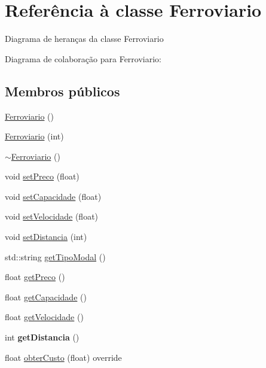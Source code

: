 \hypertarget{classFerroviario}{}\section{Referência à classe Ferroviario}
\label{classFerroviario}


Diagrama de heranças da classe Ferroviario


Diagrama de colaboração para Ferroviario\+:
\subsection*{Membros públicos}
\begin{DoxyCompactItemize}
\item 
\hyperlink{classFerroviario_ad9ab87f65b1e904a3fec909076f0a993}{Ferroviario} ()
\item 
\hyperlink{classFerroviario_a497cd242a790babb459821c59ff3678c}{Ferroviario} (int)
\item 
\hyperlink{classFerroviario_a14356b699e7cd2651654ef06029d2f0d}{$\sim$\+Ferroviario} ()
\item 
void \hyperlink{classFerroviario_a51c231a25084ce9bef1648642196b94e}{set\+Preco} (float)
\item 
void \hyperlink{classFerroviario_aa40975457d7179ba75d5436251ca66e0}{set\+Capacidade} (float)
\item 
void \hyperlink{classFerroviario_a773bb8838b8e651c5a59a196fd3df6be}{set\+Velocidade} (float)
\item 
void \hyperlink{classFerroviario_a3015ee3389051f06e8bccbd70832ca4a}{set\+Distancia} (int)
\item 
std\+::string \hyperlink{classFerroviario_a6d75f014c46c8c24ed2c121baa1cda0b}{get\+Tipo\+Modal} ()
\item 
float \hyperlink{classFerroviario_a2face4e080b96591614237d88bda094c}{get\+Preco} ()
\item 
float \hyperlink{classFerroviario_a990ce4dac67327abd75d66f94bf5d358}{get\+Capacidade} ()
\item 
float \hyperlink{classFerroviario_a643ac2394764eb83835e63088f116ac4}{get\+Velocidade} ()
\item 
\mbox{\label{classFerroviario_a80ae820b1f0e8cffd0063c332404c765}} 
int {\bfseries get\+Distancia} ()
\item 
float \hyperlink{classFerroviario_a691452311fe49e6573e47220fa372d15}{obter\+Custo} (float) override
\end{DoxyCompactItemize}
